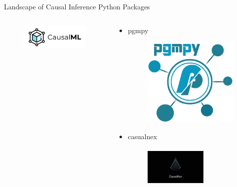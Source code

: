 \documentclass{beamer}
\begin{document}
\begin{frame}{Landscape of Causal Inference Python Packages}
\begin{columns}
\begin{column}{0.5 \textwidth}
\begin{itemize}
					\begin{figure}
						\includegraphics[scale=0.3]{imgs/causalml.png}
					\end{figure}
			\end{itemize}

		\end{column}
		\vrule
		\begin{column}{0.5 \textwidth}
			\begin{itemize}
				\item pgmpy
					\begin{figure}
						\includegraphics[scale=0.2]{imgs/pgmpy.png}
					\end{figure}
				\item casualnex
					\begin{figure}
						\includegraphics[height=2cm, width=3cm, scale=0.2]{imgs/causalnex.png}
					\end{figure}
			\end{itemize}
			\vspace{2em}
		\end{column}
	\end{columns}
\end{frame}
\end{document}
